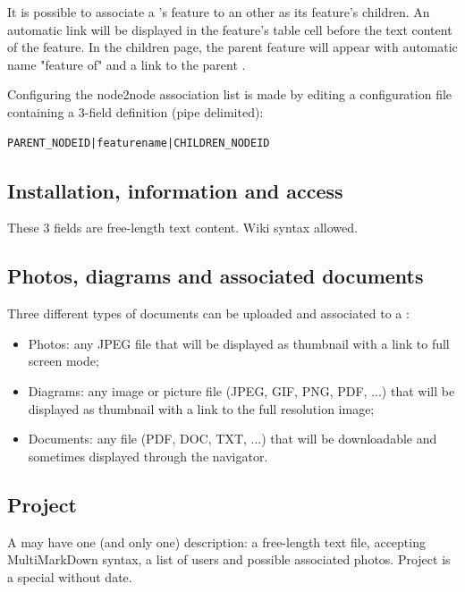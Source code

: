 It is possible to associate a 's feature to an other  as its feature's children. An automatic link will be displayed in the feature's table cell before the text content of the feature. In the children  page, the parent feature will appear with automatic name "feature of" and a link to the parent .

Configuring the node2node association list is made by editing a configuration file containing a 3-field definition (pipe delimited):

\begin{lstlisting}[title=\wofile{nodes2nodes.rc} (excerpt)]
PARENT_NODEID|featurename|CHILDREN_NODEID
\end{lstlisting}


\subsection{Installation, information and access}

These 3 fields are free-length text content. Wiki syntax allowed.

\subsection{Photos, diagrams and associated documents}

Three different types of documents can be uploaded and associated to a :
\begin{itemize}
	\item Photos: any JPEG file that will be displayed as thumbnail with a link to full screen mode;
	\item Diagrams: any image or picture file (JPEG, GIF, PNG, PDF, ...) that will be displayed as thumbnail with a link to the full resolution image;
	\item Documents: any file (PDF, DOC, TXT, ...) that will be downloadable and sometimes displayed through the navigator.
\end{itemize}


\subsection{Project}
\label{projectnode}

A  may have one (and only one)  description: a free-length text file, accepting MultiMarkDown syntax, a list of users and possible associated photos. Project is a special  without date.

